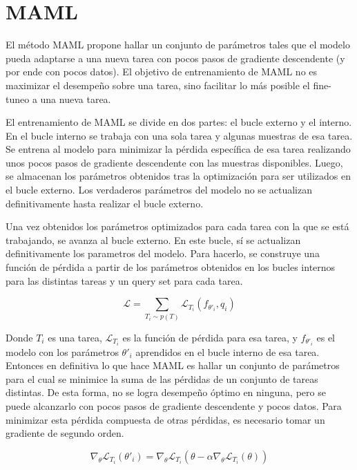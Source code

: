 \documentclass[12pt]{article}
\begin{document}
\section{MAML}

El método MAML propone hallar un conjunto de parámetros tales que el modelo pueda adaptarse a una nueva tarea con pocos pasos de gradiente descendente (y por ende con pocos datos). El objetivo de entrenamiento de MAML no es maximizar el desempeño sobre una tarea, sino facilitar lo más posible el fine-tuneo a una nueva tarea.

El entrenamiento de MAML se divide en dos partes: el bucle externo y el interno. En el bucle interno se trabaja con una sola tarea y algunas muestras de esa tarea. Se entrena al modelo para minimizar la pérdida específica de esa tarea realizando unos pocos pasos de gradiente descendente con las muestras disponibles. Luego, se almacenan los parámetros obtenidos tras la optimización para ser utilizados en el bucle externo. Los verdaderos parámetros del modelo no se actualizan definitivamente hasta realizar el bucle externo.

Una vez obtenidos los parámetros optimizados para cada tarea con la que se está trabajando, se avanza al bucle externo. En este bucle, sí se actualizan definitivamente los parametros del modelo. Para hacerlo, se construye una función de pérdida a partir de los parámetros obtenidos en los bucles internos para las distintas tareas y un query set para cada tarea.

\begin{equation}
    \mathcal{L} = \sum_{T_i \sim p(T)} \mathcal{L}_{T_i}(f_{\theta'_i}, q_i)
\end{equation}

Donde $T_i$ es una tarea, $\mathcal{L}_{T_i}$ es la función de pérdida para esa tarea, y $f_{\theta'_i}$ es el modelo con los parámetros $\theta'_i$ aprendidos en el bucle interno de esa tarea. Entonces en definitiva lo que hace MAML es hallar un conjunto de parámetros para el cual se minimice la suma de las pérdidas de un conjunto de tareas distintas. De esta forma, no se logra desempeño óptimo en ninguna, pero se puede alcanzarlo con pocos pasos de gradiente descendente y pocos datos. Para minimizar esta pérdida compuesta de otras pérdidas, es necesario tomar un gradiente de segundo orden.

\begin{equation}
    \nabla_\theta \mathcal{L}_{T_i}(\theta'_i) = \nabla_\theta \mathcal{L}_{T_i}\!\left(\theta - \alpha \nabla_\theta \mathcal{L}_{T_i}(\theta)\right)
\end{equation}
\end{document}
